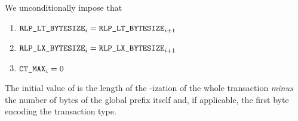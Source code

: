 \begin{center}
\end{center}

We unconditionally impose that
\begin{enumerate}
	\item $\texttt{RLP\_LT\_BYTESIZE} _{i} = \texttt{RLP\_LT\_BYTESIZE} _{i + 1}$
	\item $\texttt{RLP\_LX\_BYTESIZE} _{i} = \texttt{RLP\_LX\_BYTESIZE} _{i + 1}$
	\item $\texttt{CT\_MAX}    _{i} = 0$
\end{enumerate}
\saNote{}
The initial value of \rlptsize{}
is the length of the \rlp{}-ization of the whole transaction \emph{minus}
the number of bytes of the global \rlp{} prefix itself and,
if applicable, the first byte encoding the transaction type.

